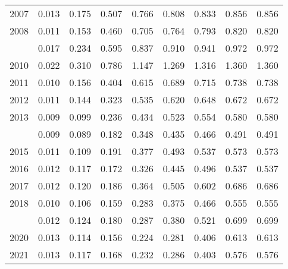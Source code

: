 \documentclass[
]{article}
\begin{document}
\begin{longtable}[t]{lrrrrrrrr}
2007 & 0.013 & 0.175 & 0.507 & 0.766 & 0.808 & 0.833 & 0.856 & 0.856\\
2008 & 0.011 & 0.153 & 0.460 & 0.705 & 0.764 & 0.793 & 0.820 & 0.820\\
\addlinespace
2009 & 0.017 & 0.234 & 0.595 & 0.837 & 0.910 & 0.941 & 0.972 & 0.972\\
2010 & 0.022 & 0.310 & 0.786 & 1.147 & 1.269 & 1.316 & 1.360 & 1.360\\
2011 & 0.010 & 0.156 & 0.404 & 0.615 & 0.689 & 0.715 & 0.738 & 0.738\\
2012 & 0.011 & 0.144 & 0.323 & 0.535 & 0.620 & 0.648 & 0.672 & 0.672\\
2013 & 0.009 & 0.099 & 0.236 & 0.434 & 0.523 & 0.554 & 0.580 & 0.580\\
\addlinespace
2014 & 0.009 & 0.089 & 0.182 & 0.348 & 0.435 & 0.466 & 0.491 & 0.491\\
2015 & 0.011 & 0.109 & 0.191 & 0.377 & 0.493 & 0.537 & 0.573 & 0.573\\
2016 & 0.012 & 0.117 & 0.172 & 0.326 & 0.445 & 0.496 & 0.537 & 0.537\\
2017 & 0.012 & 0.120 & 0.186 & 0.364 & 0.505 & 0.602 & 0.686 & 0.686\\
2018 & 0.010 & 0.106 & 0.159 & 0.283 & 0.375 & 0.466 & 0.555 & 0.555\\
\addlinespace
2019 & 0.012 & 0.124 & 0.180 & 0.287 & 0.380 & 0.521 & 0.699 & 0.699\\
2020 & 0.013 & 0.114 & 0.156 & 0.224 & 0.281 & 0.406 & 0.613 & 0.613\\
2021 & 0.013 & 0.117 & 0.168 & 0.232 & 0.286 & 0.403 & 0.576 & 0.576\\*
\end{longtable}
\end{document}
